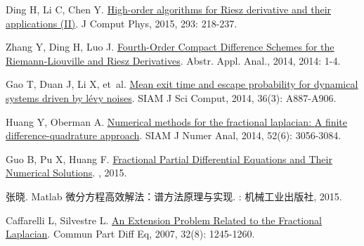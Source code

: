 \begin{thebibliography}{79}
    Ding H, Li C, Chen Y.
    \newblock \href{https://www.sciencedirect.com/science/article/pii/S0021999114004148}{High-order algorithms for {{Riesz}} derivative and their applications ({{II}})}\allowbreak[J].
    \newblock J Comput Phys, 2015, 293: 218-237.
    
    Zhang Y, Ding H, Luo J.
    \newblock \href{http://www.hindawi.com/journals/aaa/2014/540692/}{Fourth-{{Order Compact Difference Schemes}} for the {{Riemann-Liouville}} and {{Riesz Derivatives}}}\allowbreak[J].
    \newblock Abstr. Appl. Anal., 2014, 2014: 1-4.
    
    Gao T, Duan J, Li X, et~al.
    \newblock \href{https://doi.org/10.1137/120897262}{Mean exit time and escape probability for dynamical systems driven by l{\'e}vy noises}\allowbreak[J].
    \newblock SIAM J Sci Comput, 2014, 36\allowbreak (3): A887-A906.
    
    Huang Y, Oberman A.
    \newblock \href{https://doi.org/10.1137/140954040}{Numerical methods for the fractional laplacian: {{A}} finite difference-quadrature approach}\allowbreak[J].
    \newblock SIAM J Numer Anal, 2014, 52\allowbreak (6): 3056-3084.
    
    Guo B, Pu X, Huang F.
    \newblock \href{https://www.worldscientific.com/worldscibooks/10.1142/9543}{{Fractional Partial Differential Equations and Their Numerical Solutions}}\allowbreak[M].
    , 2015.
    
    {张晓}.
    \newblock Matlab 微分方程高效解法：谱方法原理与实现\allowbreak[M].
    : {机械工业出版社}, 2015.
    
    Caffarelli L, Silvestre L.
    \newblock \href{http://www.tandfonline.com/doi/abs/10.1080/03605300600987306}{An {{Extension Problem Related}} to the {{Fractional Laplacian}}}\allowbreak[J].
    \newblock Commun Part Diff Eq, 2007, 32\allowbreak (8): 1245-1260.
    

\end{thebibliography}

